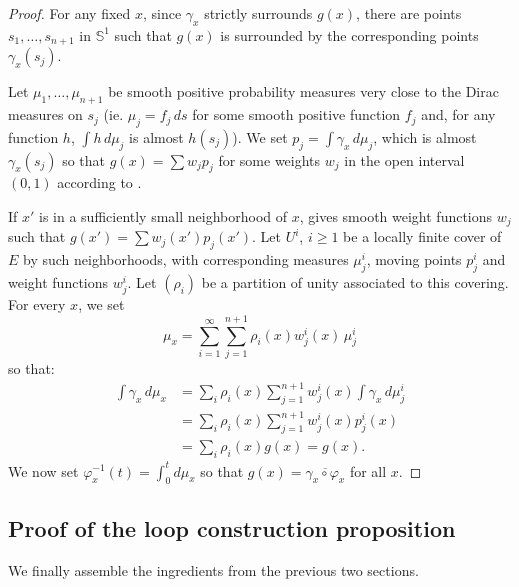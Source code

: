 \begin{proof}
  \leanok
  For any fixed $x$, since $γ_x$ strictly surrounds $g(x)$, there are points
  $s_1, …, s_{n+1}$ in $𝕊^1$ such that $g(x)$ is surrounded
  by the corresponding points $γ_x(s_j)$.

  Let $μ_1, …, μ_{n+1}$ be smooth positive probability measures very
  close to the Dirac measures on $s_j$ (ie. $μ_j = f_j\, ds$ for some
  smooth positive function $f_j$ and, for any function $h$,
  $\int h\,dμ_j$ is almost $h(s_j)$).  We set $p_j = \int γ_x\, d\mu_j$, which
  is almost $γ_x(s_j)$ so that $g(x) = \sum w_j p_j$ for some weights
  $w_j$ in the open interval $(0, 1)$ according to
  .

  If $x'$ is in a sufficiently small neighborhood of $x$,
   gives smooth weight functions $w_j$
  such that $g(x') = \sum w_j(x')p_j(x')$.
  Let $U^i$, $i ≥ 1$ be a locally finite cover of $E$ by such
  neighborhoods, with corresponding measures $μ_j^i$, moving points
  $p_j^i$ and weight functions $w_j^i$.
  Let $(ρ_i)$ be a partition of unity associated to this covering. For
  every $x$, we set
  \[
    μ_x = \sum_{i=1}^∞ \sum_{j=1}^{n+1} ρ_i(x)w_j^i(x)\, μ_j^i
  \]
  so that:
  \begin{align*}
    \int γ_x\, dμ_x &=
    \sum_i ρ_i(x)\sum_{j=1}^{n+1} w_j^i(x) \int γ_x\, dμ_j^i\\
    &= \sum_i ρ_i(x)\sum_{j=1}^{n+1} w_j^i(x) p_j^i(x)\\
    &= \sum_i ρ_i(x) g(x) = g(x).
  \end{align*}
  We now set $φ_x^{-1}(t) = \int_0^tdμ_x$ so that
  $g(x) = \overline{γ_x ∘ φ_x}$ for all $x$.
\end{proof}

\subsection{Proof of the loop construction proposition}
\label{sub:proof_of_the_loop_construction_proposition}

We finally assemble the ingredients from the previous two sections.

